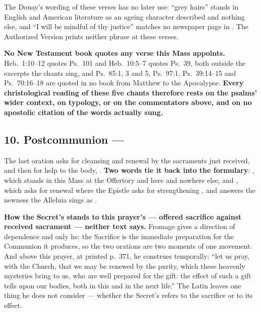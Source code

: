 The Douay's wording of these verses has no later use: ``grey hairs'' stands in
English and American literature as an ageing character described and nothing
else, and ``I will be mindful of thy justice'' matches no newspaper page in
. The Authorized Version prints neither phrase at
these verses.

\textbf{No New Testament book quotes any verse this Mass appoints.} Heb.~1:10--12
quotes Ps.~101 and Heb.~10:5--7 quotes Ps.~39, both outside the excerpts the
chants sing, and Ps.~85:1, 3 and 5, Ps.~97:1, Ps.~39:14--15 and Ps.~70:16--18 are
quoted in no book from Matthew to the Apocalypse. \textbf{Every christological
reading of these five chants therefore rests on the psalms' wider context, on
typology, or on the commentators above, and on no apostolic citation of the
words actually sung.}

\subsection*{10. Postcommunion  --- }

The last oration asks for cleansing and renewal by the sacraments just received,
and then for help to the body, . \textbf{Two
words tie it back into the formulary}: , which stands in this
Mass at the Offertory and here and nowhere else, and , which asks
for renewal where the Epistle asks for strengthening , and answers the newness the Alleluia sings as .

\textbf{How the Secret's  stands to this
prayer's  --- offered sacrifice against
received sacrament --- neither text says.} Fromage gives a direction of
dependence and only he: the Sacrifice is the immediate preparation for the
Communion it produces, so the two orations are two moments of one movement. And
above this prayer, at printed p.~371, he construes  temporally: ``let us pray, with the Church, that we may be renewed by
the purity, which these heavenly mysteries bring to us, who are well prepared for
the gift: the effect of such a gift tells upon our bodies, both in this and in
the next life.'' The Latin leaves one thing he does not consider --- whether the
Secret's  refers to the sacrifice or to its effect.

